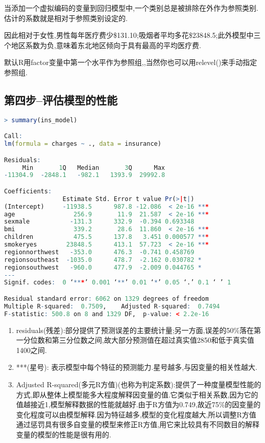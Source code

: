 \documentclass[11pt,a4paper,oneside]{book}
\begin{document}
当添加一个虚拟编码的变量到回归模型中,一个类别总是被排除在外作为参照类别.估计的系数就是相对于参照类别设定的.

因此相对于女性,男性每年医疗费少\$131.10;吸烟者平均多花\$23848.5;此外模型中三个地区系数为负,意味着东北地区倾向于具有最高的平均医疗费.

\begin{tcolorbox}[colback=pink!10!white,colframe=pink!100!black]
默认R用factor变量中第一个水平作为参照组,,当然你也可以用relevel()来手动指定参照组.
\end{tcolorbox}

\subsection{第四步--评估模型的性能}

\begin{lstlisting}[language=r]
> summary(ins_model)

Call:
lm(formula = charges ~ ., data = insurance)

Residuals:
     Min       1Q   Median       3Q      Max 
-11304.9  -2848.1   -982.1   1393.9  29992.8 

Coefficients:
                Estimate Std. Error t value Pr(>|t|)    
(Intercept)     -11938.5      987.8 -12.086  < 2e-16 ***
age                256.9       11.9  21.587  < 2e-16 ***
sexmale           -131.3      332.9  -0.394 0.693348    
bmi                339.2       28.6  11.860  < 2e-16 ***
children           475.5      137.8   3.451 0.000577 ***
smokeryes        23848.5      413.1  57.723  < 2e-16 ***
regionnorthwest   -353.0      476.3  -0.741 0.458769    
regionsoutheast  -1035.0      478.7  -2.162 0.030782 *  
regionsouthwest   -960.0      477.9  -2.009 0.044765 *  
---
Signif. codes:  0 ‘***’ 0.001 ‘**’ 0.01 ‘*’ 0.05 ‘.’ 0.1 ‘ ’ 1

Residual standard error: 6062 on 1329 degrees of freedom
Multiple R-squared:  0.7509,	Adjusted R-squared:  0.7494 
F-statistic: 500.8 on 8 and 1329 DF,  p-value: < 2.2e-16
\end{lstlisting}
\begin{enumerate}
	\item residuals(残差):部分提供了预测误差的主要统计量;另一方面,误差的50\%落在第一分位数和第三分位数之间,故大部分预测值在超过真实值2850和低于真实值1400之间.
	\item ***(星号): 表示模型中每个特征的预测能力.星号越多,与因变量的相关性越大.
	\item Adjusted R-squared(多元R方值)(也称为判定系数):提供了一种度量模型性能的方式,即从整体上模型能多大程度解释因变量的值.它类似于相关系数,因为它的值越接近1,模型解释数据的性能就越好.由于R方值为0.749,故近75\%的因变量的变化程度可以由模型解释.因为特征越多,模型的变化程度越大,所以调整R方值通过惩罚具有很多自变量的模型来修正R方值,用它来比较具有不同数目的解释变量的模型的性能是很有用的.
\end{enumerate}
\end{document}
